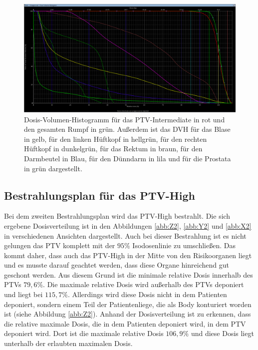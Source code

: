 \begin{figure}[H]
  \centering
  \includegraphics[width=\textwidth]{Bilder/Prostata1_DVH.png}
  \caption{Dosis-Volumen-Histogramm für das PTV-Intermediate in rot und den gesamten Rumpf in grün. Außerdem ist das DVH für das Blase in gelb, für den linken Hüftkopf in hellgrün, für den rechten Hüftkopf in dunkelgrün, für das Rektum in braun, für den Darmbeutel in Blau, für den Dünndarm in lila und für die Prostata in grün dargestellt.}
  \label{abb:DVH1}
\end{figure}


\subsection*{Bestrahlungsplan für das PTV-High}

Bei dem zweiten Bestrahlungsplan wird das PTV-High bestrahlt. Die sich ergebene Dosisverteilung
ist in den Abbildungen \ref{abb:Z2}, \ref{abb:Y2} und \ref{abb:X2} in verschiedenen
Ansichten dargestellt. Auch bei dieser Bestrahlung ist es nicht gelungen das PTV komplett
mit der $95\%$ Isodosenlinie zu umschließen. Das kommt daher, dass auch das PTV-High in der
Mitte von den Risikoorganen liegt und es musste darauf geachtet werden, dass diese Organe hinreichend
gut geschont werden. Aus diesem Grund ist die minimale relative Dosis innerhalb des PTVs
$79,6\%$. Die maximale relative Dosis wird außerhalb des PTVs deponiert und liegt
bei $115,7\%$. Allerdings wird diese Dosis nicht in dem Patienten deponiert, sondern einem
Teil der Patientenliege, die als Body konturiert worden ist (siehe Abbildung \ref{abb:Z2}).
Anhand der Dosisverteilung ist zu erkennen, dass die relative maximale Dosis, die in dem
Patienten deponiert wird, in dem PTV deponiert wird. Dort ist die maximale relative Dosis
$106,9\%$ und diese Dosis liegt unterhalb der erlaubten maximalen Dosis.

